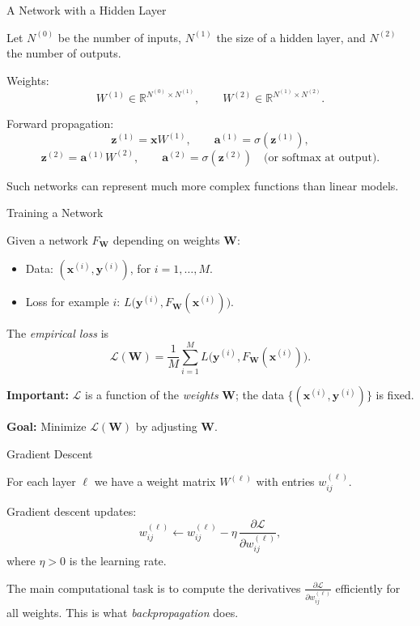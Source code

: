 \documentclass[aspectratio=169]{beamer}
\begin{document}
\begin{frame}{A Network with a Hidden Layer}

Let $N^{(0)}$ be the number of inputs, $N^{(1)}$ the size of a hidden
layer, and $N^{(2)}$ the number of outputs.

\medskip

Weights:
\[
  W^{(1)} \in \mathbb{R}^{N^{(0)}\times N^{(1)}},\qquad
  W^{(2)} \in \mathbb{R}^{N^{(1)}\times N^{(2)}}.
\]

Forward propagation:
\[
  \bm{z}^{(1)} = \bm{x} W^{(1)}, \qquad
  \bm{a}^{(1)} = \sigma(\bm{z}^{(1)}),
\]
\[
  \bm{z}^{(2)} = \bm{a}^{(1)} W^{(2)}, \qquad
  \bm{a}^{(2)} = \sigma(\bm{z}^{(2)}) \quad\text{(or softmax at output).}
\]

Such networks can represent much more complex functions than linear
models.

\end{frame}

\begin{frame}{Training a Network}

Given a network $F_{\bm{W}}$ depending on weights $\bm{W}$:

\begin{itemize}
  \item Data: $(\bm{x}^{(i)}, \bm{y}^{(i)})$, for $i=1,\dots,M$.
  \item Loss for example $i$:
        $L\bigl(\bm{y}^{(i)}, F_{\bm{W}}(\bm{x}^{(i)})\bigr)$.
\end{itemize}

The \emph{empirical loss} is
\[
  \mathcal{L}(\bm{W})
   = \frac{1}{M}\sum_{i=1}^M
     L\bigl(\bm{y}^{(i)}, F_{\bm{W}}(\bm{x}^{(i)})\bigr).
\]

\medskip

\textbf{Important:} $\mathcal{L}$ is a function of the \emph{weights} $\bm{W}$;
the data $\{(\bm{x}^{(i)},\bm{y}^{(i)})\}$ is fixed.

\medskip

\textbf{Goal:} Minimize $\mathcal{L}(\bm{W})$ by adjusting $\bm{W}$.

\end{frame}

\begin{frame}{Gradient Descent}

For each layer $\ell$ we have a weight matrix $W^{(\ell)}$ with entries
$w^{(\ell)}_{ij}$.

\medskip

Gradient descent updates:
\[
  w^{(\ell)}_{ij} \leftarrow
  w^{(\ell)}_{ij}
  - \eta \,\frac{\partial \mathcal{L}}{\partial w^{(\ell)}_{ij}},
\]
where $\eta>0$ is the learning rate.

\medskip

The main computational task is to compute the derivatives
$\frac{\partial \mathcal{L}}{\partial w^{(\ell)}_{ij}}$ efficiently for
all weights.  This is what \emph{backpropagation} does.

\end{frame}
\end{document}
